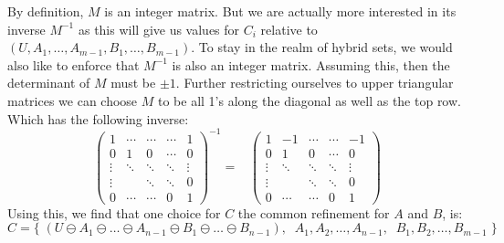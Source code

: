 By definition, $M$ is an integer matrix.
But we are actually more interested in its inverse $M^{-1}$ as this will give us values for $C_i$ 
relative to $( U, A_1, \ldots, A_{m-1}, B_1, \ldots, B_{m-1} )$.
To stay in the realm of hybrid sets, we would also like to enforce that $M^{-1}$ is also an integer matrix.
Assuming this, then the determinant of $M$ must be $\pm 1$.
Further restricting ourselves to upper triangular matrices we can choose $M$ to be all 1's along the diagonal
as well as the top row. 
Which has the following inverse:
\begin{equation*}
	\begin{pmatrix}
		1 		&\cdots 	&\cdots 	&\cdots 	& 1 		\\[-0.5em]
		0		& 1		& 0 		&\cdots 	& 0 		\\[-0.5em]
		\vdots 	&\ddots 	&\ddots 	&\ddots 	&\vdots 	\\[-0.5em]
		\vdots 	&		&\ddots 	&\ddots 	& 0 		\\[-0.5em]
		0 		&\cdots 	&\cdots 	& 0 		& 1
	\end{pmatrix}^{-1}
	= \; \; \;
	\begin{pmatrix}
		1 		&-1	 	&\cdots 	&\cdots 	& -1		\\[-0.5em]
		0		& 1		& 0 		&\cdots 	& 0 		\\[-0.5em]
		\vdots 	&\ddots 	&\ddots 	&\ddots 	&\vdots 	\\[-0.5em]
		\vdots 	&		&\ddots 	&\ddots 	& 0 		\\[-0.5em]
		0 		&\cdots 	&\cdots 	& 0 		& 1
	\end{pmatrix}
\end{equation*}
Using this, we find that one choice for $C$ the common refinement for $A$ and $B$, is:
\begin{equation*}
	C = \Big\{\; 
	(U \ominus A_1 \ominus \ldots \ominus A_{n-1} \ominus B_1 \ominus \ldots \ominus B_{n-1}), \;\;
	A_1, A_2, \ldots, A_{n-1}, \;\; B_1, B_2, \ldots, B_{m-1}
	\;\Big\}
\end{equation*}


